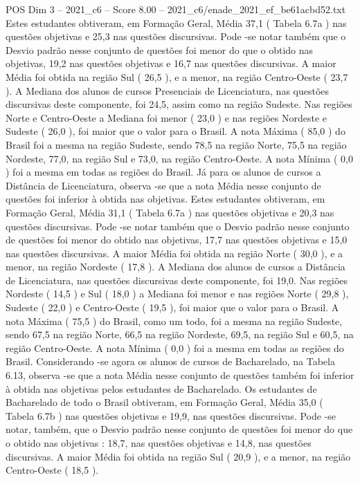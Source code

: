 \begin{textsample}{POS Dim 3 – 2021\_c6 – Score 8.00 – 2021\_c6/enade\_2021\_ef\_be61acbd52.txt}
Estes estudantes obtiveram, em Formação Geral, Média 37,1 ( Tabela 6.7a ) nas questões objetivas e 25,3 nas questões discursivas.
Pode -se notar também que o Desvio padrão nesse conjunto de questões foi menor do que o obtido nas objetivas, 19,2 nas questões objetivas e 16,7 nas questões discursivas.
A maior Média foi obtida na região Sul ( 26,5 ), e a menor, na região Centro-Oeste ( 23,7 ).
A Mediana dos alunos de cursos Presenciais de Licenciatura, nas questões discursivas deste componente, foi 24,5, assim como na região Sudeste.
Nas regiões Norte e Centro-Oeste a Mediana foi menor ( 23,0 ) e nas regiões Nordeste e Sudeste ( 26,0 ), foi maior que o valor para o Brasil.
A nota Máxima ( 85,0 ) do Brasil foi a mesma na região Sudeste, sendo 78,5 na região Norte, 75,5 na região Nordeste, 77,0, na região Sul e 73,0, na região Centro-Oeste.
A nota Mínima ( 0,0 ) foi a mesma em todas as regiões do Brasil.
Já para os alunos de cursos a Distância de Licenciatura, observa -se que a nota Média nesse conjunto de questões foi inferior à obtida nas objetivas.
Estes estudantes obtiveram, em Formação Geral, Média 31,1 ( Tabela 6.7a ) nas questões objetivas e 20,3 nas questões discursivas.
Pode -se notar também que o Desvio padrão nesse conjunto de questões foi menor do obtido nas objetivas, 17,7 nas questões objetivas e 15,0 nas questões discursivas.
A maior Média foi obtida na região Norte ( 30,0 ), e a menor, na região Nordeste ( 17,8 ).
A Mediana dos alunos de cursos a Distância de Licenciatura, nas questões discursivas deste componente, foi 19,0.
Nas regiões Nordeste ( 14,5 ) e Sul ( 18,0 ) a Mediana foi menor e nas regiões Norte ( 29,8 ), Sudeste ( 22,0 ) e Centro-Oeste ( 19,5 ), foi maior que o valor para o Brasil.
A nota Máxima ( 75,5 ) do Brasil, como um todo, foi a mesma na região Sudeste, sendo 67,5 na região Norte, 66,5 na região Nordeste, 69,5, na região Sul e 60,5, na região Centro-Oeste.
A nota Mínima ( 0,0 ) foi a mesma em todas as regiões do Brasil.
Considerando -se agora os alunos de cursos de Bacharelado, na Tabela 6.13, observa -se que a nota Média nesse conjunto de questões também foi inferior à obtida nas objetivas pelos estudantes de Bacharelado.
Os estudantes de Bacharelado de todo o Brasil obtiveram, em Formação Geral, Média 35,0 ( Tabela 6.7b ) nas questões objetivas e 19,9, nas questões discursivas.
Pode -se notar, também, que o Desvio padrão nesse conjunto de questões foi menor do que o obtido nas objetivas : 18,7, nas questões objetivas e 14,8, nas questões discursivas.
A maior Média foi obtida na região Sul ( 20,9 ), e a menor, na região Centro-Oeste ( 18,5 ).

\end{textsample}
